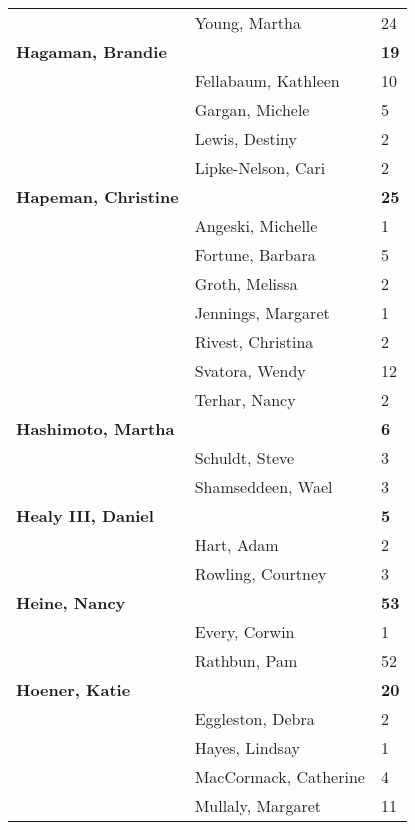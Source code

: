 \documentclass{article}\usepackage[]{graphicx}\usepackage[]{color}
\begin{document}
{\begin{longtable} { >{\raggedright}p{}|p{}p{}}
   \rowcolor[gray]{0.90} & Young, Martha & 24 \\ 
  \textbf{Hagaman, Brandie} &  & \hspace{2cm}\textbf{19} \\ 
   & Fellabaum, Kathleen & 10 \\ 
   & Gargan, Michele & 5 \\ 
   \rowcolor[gray]{0.90} & Lewis, Destiny & 2 \\ 
   \rowcolor[gray]{0.90} & Lipke-Nelson, Cari & 2 \\ 
   \rowcolor[gray]{0.90}\textbf{Hapeman, Christine} &  & \hspace{2cm}\textbf{25} \\ 
   & Angeski, Michelle & 1 \\ 
   & Fortune, Barbara & 5 \\ 
   & Groth, Melissa & 2 \\ 
   \rowcolor[gray]{0.90} & Jennings, Margaret & 1 \\ 
   \rowcolor[gray]{0.90} & Rivest, Christina & 2 \\ 
   \rowcolor[gray]{0.90} & Svatora, Wendy & 12 \\ 
   & Terhar, Nancy & 2 \\ 
  \textbf{Hashimoto, Martha} &  & \hspace{2cm}\textbf{6} \\ 
   & Schuldt, Steve & 3 \\ 
   \rowcolor[gray]{0.90} & Shamseddeen, Wael & 3 \\ 
   \rowcolor[gray]{0.90}\textbf{Healy III, Daniel} &  & \hspace{2cm}\textbf{5} \\ 
   \rowcolor[gray]{0.90} & Hart, Adam & 2 \\ 
   & Rowling, Courtney & 3 \\ 
  \textbf{Heine, Nancy} &  & \hspace{2cm}\textbf{53} \\ 
   & Every, Corwin & 1 \\ 
   \rowcolor[gray]{0.90} & Rathbun, Pam & 52 \\ 
   \rowcolor[gray]{0.90}\textbf{Hoener, Katie} &  & \hspace{2cm}\textbf{20} \\ 
   \rowcolor[gray]{0.90} & Eggleston, Debra & 2 \\ 
   & Hayes, Lindsay & 1 \\ 
   & MacCormack, Catherine & 4 \\ 
   & Mullaly, Margaret & 11 \\ 

\end{longtable}}
\end{document}

